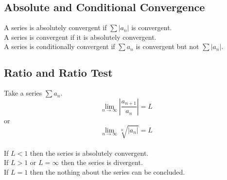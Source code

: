 \documentclass[12pt]{article}
\begin{document}
\subsection{Absolute and Conditional Convergence}

A series is absolutely convergent if $\sum \left|a_n\right|$ is convergent.\\
A series is convergent if it is absolutely convergent.\\
A series is conditionally convergent if $\sum a_n$ is convergent but not $\sum \left|a_n\right|$.\\


\subsection{Ratio and Ratio Test}

Take a series $\sum a_n$.
\\
\begin{displaymath}
\lim_{n\to\infty} \left|\frac{a_{n+1}}{a_n}\right| = L
\end{displaymath}
or\\
\begin{displaymath}
\lim_{n\to\infty} \sqrt[n]{\left|a_n\right|} = L
\end{displaymath}
\\
If $L < 1$ then the series is absolutely convergent.\\
If $L > 1\text{ or }L = \infty$ then the series is divergent.\\
If $L = 1$ then the nothing about the series can be concluded.
\end{document}
